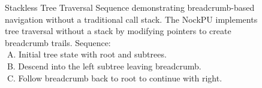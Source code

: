 \begin{figure}[htbp]
\caption{Stackless Tree Traversal Sequence demonstrating breadcrumb-based navigation without a traditional call stack.  The NockPU implements tree traversal without a stack by modifying pointers to create breadcrumb trails.  Sequence:\\
\textcolor{white}{.}\quad A. Initial tree state with root and subtrees. \\
\textcolor{white}{.}\quad B. Descend into the left subtree leaving breadcrumb. \\
\textcolor{white}{.}\quad C. Follow breadcrumb back to root to continue with right.
}
\label{fig:tree-traversal}
\end{figure}
